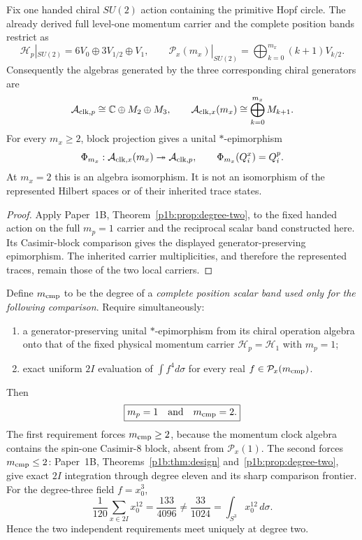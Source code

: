 \documentclass[12pt,a4paper]{article}
\begin{document}
\begin{proposition}
\label{p2c:prop:generated-chiral-operation-algebras}
Fix one handed chiral $SU(2)$ action containing the primitive Hopf circle.
The already derived full level-one momentum carrier and the complete position
bands restrict as
\[
 \mathcal H_p|_{SU(2)}=6V_0\oplus3V_{1/2}\oplus V_1,
 \qquad
 \mathcal P_x(m_x)|_{SU(2)}=
 \bigoplus_{k=0}^{m_x}(k+1)V_{k/2}.
\]
Consequently the algebras generated by the three corresponding chiral
generators are
\[
 \mathcal A_{{\rm clk},p}\cong\mathbb C\oplus M_2\oplus M_3,
 \qquad
 \mathcal A_{{\rm clk},x}(m_x)\cong
 \bigoplus_{k=0}^{m_x}M_{k+1}.
\]
For every $m_x\ge2$, block projection gives a unital $*$-epimorphism
\[
 \Phi_{m_x}:\mathcal A_{{\rm clk},x}(m_x)
 \twoheadrightarrow\mathcal A_{{\rm clk},p},\qquad
 \Phi_{m_x}(Q_i^x)=Q_i^p .
\]
At $m_x=2$ this is an algebra isomorphism.  It is not an isomorphism of the
represented Hilbert spaces or of their inherited trace states.
\end{proposition}
\begin{proof}
Apply Paper~1B, Theorem~\ref{p1b:prop:degree-two}, to the fixed
handed action on the full $m_p=1$ carrier and the reciprocal scalar band
constructed here. Its Casimir-block comparison gives the displayed
generator-preserving epimorphism. The inherited carrier multiplicities,
and therefore the represented traces, remain those of the two local
carriers.
\end{proof}

\begin{theorem}
\label{p2c:thm:position-to-momentum-chiral-quotient}
Define $m_{\rm cmp}$ to be the degree of a \emph{complete position scalar
band used only for the following comparison}.  Require simultaneously:
\begin{enumerate}
 \item a generator-preserving unital $*$-epimorphism from its chiral
 operation algebra onto that of the fixed physical momentum carrier
 $\mathcal H_p=\mathcal H_1$ with $m_p=1$;
 \item exact uniform $2I$ evaluation of $\int f^4d\sigma$ for every real
 $f\in\mathcal P_x(m_{\rm cmp})$.
\end{enumerate}
Then
\[
 \boxed{m_p=1\quad\hbox{and}\quad m_{\rm cmp}=2.}
\]
The first requirement forces $m_{\rm cmp}\ge2$, because the momentum clock
algebra contains the spin-one Casimir-$8$ block, absent from
$\mathcal P_x(1)$.  The second forces $m_{\rm cmp}\le2$: Paper~1B,
Theorems~\ref{p1b:thm:design} and~\ref{p1b:prop:degree-two}, give exact
$2I$ integration through degree eleven and its sharp comparison frontier.
For the
degree-three field $f=x_0^3$,
\[
 \frac1{120}\sum_{x\in2I}x_0^{12}=\frac{133}{4096}
 \ne\frac{33}{1024}
 =\int_{S^3}x_0^{12}\,d\sigma .
\]
Hence the two independent requirements meet uniquely at degree two.
\end{theorem}
\end{document}

